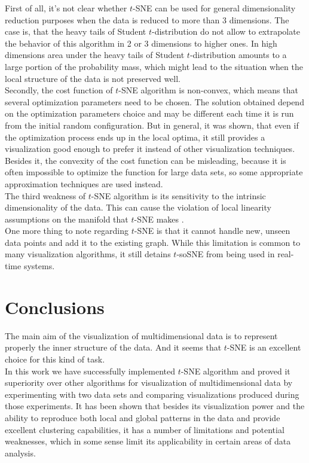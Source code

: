 First of all, it's not clear whether $t$-SNE can be used for general dimensionality reduction purposes when the data is reduced to more than 3 dimensions. The case is, that the heavy tails of Student $t$-distribution do not allow to extrapolate the behavior of this algorithm in 2 or 3 dimensions to higher ones. In high dimensions area under the heavy tails of Student $t$-distribution amounts to a large portion of the probability mass, which might lead to the situation when the local structure of the data is not preserved well. \\

Secondly, the cost function of $t$-SNE algorithm is non-convex, which means that several optimization parameters need to be chosen. The solution obtained depend on the optimization parameters choice and may be different each time it is run from the initial random configuration. But in general, it was shown, that even if the optimization process ends up in the local optima, it still provides a visualization good enough to prefer it instead of other visualization techniques. Besides it, the convexity of the cost function can be misleading, because it is often impossible to optimize the function for large data sets, so some appropriate approximation techniques are used instead. \\

The third weakness of $t$-SNE algorithm is its sensitivity to the intrinsic dimensionality of the data. This can cause the violation of local linearity assumptions on the manifold that $t$-SNE makes \cite{tsnearticle}.\\

One more thing to note regarding $t$-SNE is that it cannot handle new, unseen data points and add it to the existing graph. While this limitation is common to many visualization algorithms, it still detains $t$-soSNE from being used in real-time systems.

\section{Conclusions}

The main aim of the visualization of multidimensional data is to represent properly the inner structure of the data. And it seems that $t$-SNE is an excellent choice for this kind of task.\\

In this work we have successfully implemented $t$-SNE algorithm and proved it superiority over other algorithms for visualization of multidimensional data by experimenting with two data sets and comparing visualizations produced during those experiments. It has been shown that besides its visualization power and the ability to reproduce both local and global patterns in the data and provide excellent clustering capabilities, it has a number of limitations and potential weaknesses, which in some sense limit its applicability in certain areas of data analysis. 

